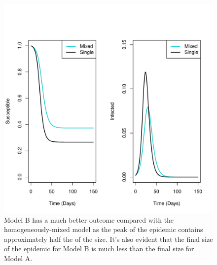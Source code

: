 \documentclass[a4paper, 12pt, journal]{ieeeconf}\usepackage[]{graphicx}\usepackage[]{color}
\makeatletter
\def\maxwidth{ %
  \ifdim\Gin@nat@width>\linewidth
    \linewidth
  \else
    \Gin@nat@width
  \fi
}
\newenvironment{knitrout}{}{} %
\makeatother
\begin{document}
\begin{knitrout}
\color{fgcolor}\begin{figure}[thpb]
\includegraphics[width=\maxwidth]{figure/R_AB-1} \caption{\label{fig:Homovshetero}Model B has a much better outcome compared with the homogeneously-mixed model as the peak of the epidemic contains approximately half the of the size. It's also evident that the final size of the epidemic for Model B is much less than the final size for Model A.}\label{fig:R_AB}
\end{figure}


\end{knitrout}
\end{document}

